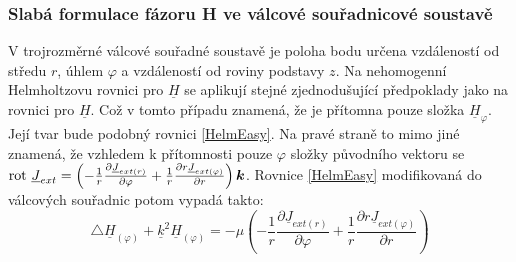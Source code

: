 \documentclass[12pt,a4paper,oneside]{article}
\numberwithin{equation}{section} %
\numberwithin{figure}{section} %
\numberwithin{table}{section} %
\renewcommand{\vec}[1]{\mbox{\boldmath$#1$}} %
\newcommand{\faz}[1]{{\underline{#1}}} %
\newcommand{\rot}{\mathrm{rot}\ }
\begin{document}
\subsubsection{Slabá formulace fázoru H ve válcové souřadnicové soustavě}

V trojrozměrné válcové souřadné soustavě je poloha bodu určena vzdáleností od středu $r$, úhlem $\varphi$ a vzdáleností od roviny podstavy $z$. Na nehomogenní Helmholtzovu rovnici pro $\faz{H}$ se aplikují stejné zjednodušující předpoklady jako na rovnici pro $\faz{H}$. Což v tomto případu znamená, že je přítomna pouze složka $\faz{H} _{\varphi}$. Její tvar bude podobný rovnici \ref{HelmEasy}. Na pravé straně to mimo jiné znamená, že vzhledem k přítomnosti pouze $\varphi$ složky původního vektoru se $\rot \faz{J} _{ext} = \left( - \frac{1}{r} \frac{\partial \faz{J} _{ext(r)}}{\partial \varphi} + \frac{1}{r} \frac{\partial r \faz{J} _{ext(\varphi)}}{\partial r} \right) \vec{k}$.  Rovnice \ref{HelmEasy} modifikovaná do válcových souřadnic potom vypadá takto:
\begin{equation}
\triangle \faz{H} _{(\varphi)} + \faz{k} ^2 \faz{H} _{(\varphi)} = - \mu \left( - \frac{1}{r} \frac{\partial \faz{J} _{ext(r)}}{\partial \varphi} + \frac{1}{r} \frac{\partial r \faz{J} _{ext(\varphi)}}{\partial r} \right)
\end{equation}
\end{document}
